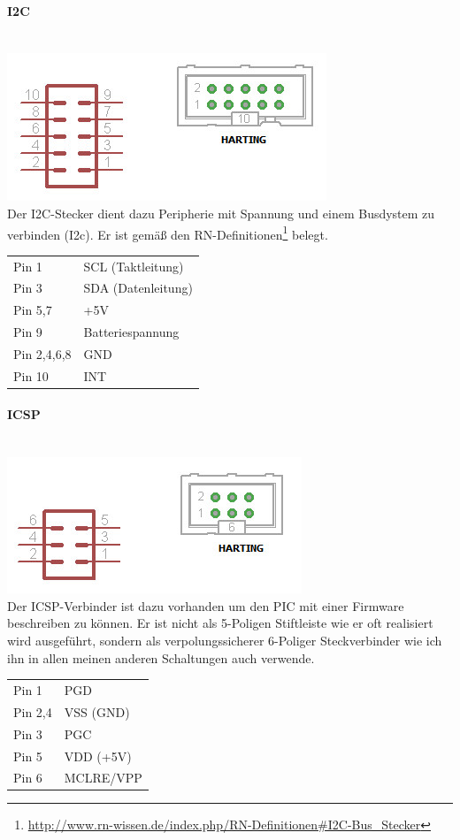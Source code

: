 \documentclass[a4paper,10pt]{article}
\begin{document}
\paragraph{I2C} \mbox{} \\
\includegraphics[scale=0.6]{connector_i2c} \\
Der I2C-Stecker dient dazu Peripherie mit Spannung und einem Busdystem zu verbinden (I2c). Er ist gemäß den RN-Definitionen\footnote{\url{http://www.rn-wissen.de/index.php/RN-Definitionen\#I2C-Bus_Stecker}} belegt.
\begin{center}
    \begin{tabular}{| l | l |}
    \hline
    Pin 1 	& SCL (Taktleitung) \\ 
    Pin 3	& SDA (Datenleitung) \\
    Pin 5,7 	& +5V \\ 
    Pin 9 	& Batteriespannung \\ 
    Pin 2,4,6,8	& GND \\
    Pin 10 	& INT \\ \hline
    \end{tabular}
\end{center}

\paragraph{ICSP} \mbox{} \\
\includegraphics[scale=0.6]{connector_icsp} \\
Der ICSP-Verbinder ist dazu vorhanden um den PIC mit einer Firmware beschreiben zu können. Er ist nicht als 5-Poligen Stiftleiste wie er oft realisiert wird ausgeführt, sondern als verpolungssicherer 6-Poliger Steckverbinder wie ich ihn in allen meinen anderen Schaltungen auch verwende.
\begin{center}
    \begin{tabular}{| l | l |}
    \hline
    Pin 1 	& PGD \\ 
    Pin 2,4	& VSS (GND) \\
    Pin 3 	& PGC \\ 
    Pin 5 	& VDD (+5V) \\ 
    Pin 6	& MCLRE/VPP \\ \hline
    \end{tabular}
\end{center}
\end{document}
